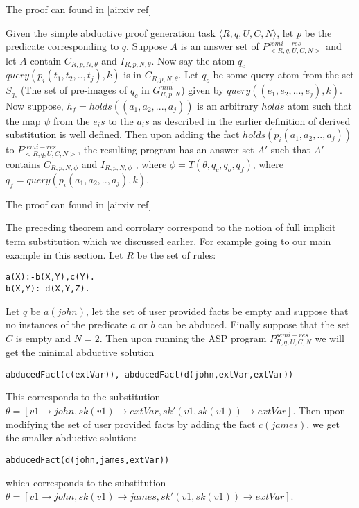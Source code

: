 The proof can found in [airxiv ref]


%


\begin{corollary}\label{thm:addfact}
Given the simple abductive proof generation task $\langle R,q,U,C,N\rangle$, let $p$ be the predicate corresponding to $q$. Suppose $A$ is an answer set of $P^{semi-res}_{<R,q,U,C,N>}$ and let $A$ contain $C_{R,p,N,\theta}$ and $I_{R,p,N,\theta}$. Now say the atom $q_{c}$ $query(p_{i}(t_{1},t_{2},..,t_{j}),k)$ is in $C_{R,p,N,\theta}$. Let $q_{o}$ be some query atom from the set $S_{q_{c}}$ (The set of pre-images of $q_{c}$ in $G_{R,p,N}^{min}$) given by $query((e_{1},e_{2},...,e_{j}),k)$. Now suppose, $h_{f}= holds((a_{1},a_{2},...,a_{j}))$ is an arbitrary $holds$ atom such that the map $\psi$ from the $e_{i}s$ to the $a_{i}s$ as described in the earlier definition of derived substitution is well defined. Then upon adding the fact $holds(p_{i}(a_{1},a_{2},..,a_{j}))$ to $P^{semi-res}_{<R,q,U,C,N>}$, the resulting program has an answer set $A'$ such that $A'$ contains $C_{R,p,N,\phi}$ and $I_{R,p,N,\phi}$ , where $\phi = T(\theta, q_{c}, q_{o}, q_{f})$, where $q_{f} = query(p_{i}(a_{1},a_{2},..,a_{j}),k)$. 
\end{corollary}

The proof can found in [airxiv ref]



The preceding theorem and corrolary correspond to the notion of full implicit term substitution which we discussed earlier. For example going to our main example in this section. Let $R$ be the set of rules:\begin{lstlisting}[frame=none]
a(X):-b(X,Y),c(Y).
b(X,Y):-d(X,Y,Z).
\end{lstlisting}

Let $q$ be $a(john)$, let the set of user provided facts be empty and suppose that no instances of the predicate $a$ or $b$ can be abduced. Finally suppose that the set $C$ is empty and $N=2$. Then upon running the ASP program $P_{R,q,U,C,N}^{semi-res}$ we will get the minimal abductive solution \begin{lstlisting}[frame=none]
abducedFact(c(extVar)), abducedFact(d(john,extVar,extVar))
\end{lstlisting} 
This corresponds to the substitution $\theta =[v1\rightarrow john,sk(v1) \rightarrow extVar, sk'(v1,sk(v1))\rightarrow extVar]$. Then upon modifying the set of user provided facts by adding the fact $c(james)$, we get the smaller abductive solution:
\begin{lstlisting}[frame=none]
abducedFact(d(john,james,extVar))
\end{lstlisting} which corresponds to the substitution $\theta =[v1\rightarrow john,sk(v1) \rightarrow james, sk'(v1,sk(v1))\rightarrow extVar]$. 

